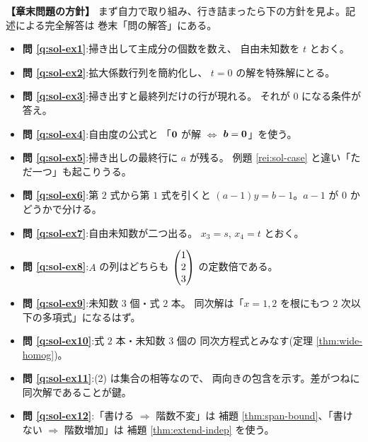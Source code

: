 \bigskip
{\small
\noindent\textbf{【章末問題の方針】}\quad
まず自力で取り組み、行き詰まったら下の方針を見よ。記述による完全解答は
巻末「問の解答」にある。
\begin{itemize}
\item \textbf{問 \ref{q:sol-ex1}}:掃き出して主成分の個数を数え、
自由未知数を $t$ とおく。
\item \textbf{問 \ref{q:sol-ex2}}:拡大係数行列を簡約化し、
$t = 0$ の解を特殊解にとる。
\item \textbf{問 \ref{q:sol-ex3}}:掃き出すと最終列だけの行が現れる。
それが $0$ になる条件が答え。
\item \textbf{問 \ref{q:sol-ex4}}:自由度の公式と
「$\bm{0}$ が解 $\iff$ $\bm{b} = \bm{0}$」を使う。
\item \textbf{問 \ref{q:sol-ex5}}:掃き出しの最終行に $a$ が残る。
例題 \ref{rei:sol-case} と違い「ただ一つ」も起こりうる。
\item \textbf{問 \ref{q:sol-ex6}}:第 $2$ 式から第 $1$ 式を引くと
$(a - 1)y = b - 1$。$a - 1$ が $0$ かどうかで分ける。
\item \textbf{問 \ref{q:sol-ex7}}:自由未知数が二つ出る。
$x_3 = s$, $x_4 = t$ とおく。
\item \textbf{問 \ref{q:sol-ex8}}:$A$ の列はどちらも
$\begin{pmatrix}1 \\ 2 \\ 3\end{pmatrix}$ の定数倍である。
\item \textbf{問 \ref{q:sol-ex9}}:未知数 $3$ 個・式 $2$ 本。
同次解は「$x = 1, 2$ を根にもつ $2$ 次以下の多項式」になるはず。
\item \textbf{問 \ref{q:sol-ex10}}:式 $2$ 本・未知数 $3$ 個の
同次方程式とみなす(定理 \ref{thm:wide-homog})。
\item \textbf{問 \ref{q:sol-ex11}}:(2) は集合の相等なので、
両向きの包含を示す。差がつねに同次解であることが鍵。
\item \textbf{問 \ref{q:sol-ex12}}:「書ける $\Rightarrow$ 階数不変」は
補題 \ref{thm:span-bound}、「書けない $\Rightarrow$ 階数増加」は
補題 \ref{thm:extend-indep} を使う。
\end{itemize}
}
